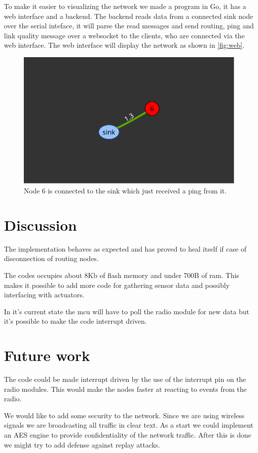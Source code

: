 \documentclass[a4paper,11pt]{article}
\begin{document}
To make it easier to visualizing the network we made a program in Go,
it has a web interface and a backend. The backend reads data from a
connected sink node over the serial inteface, it will parse the read
messages and send routing, ping and link quality message over a
websocket to the clients, who are connected via the web interface. The
web interface will display the network as shown in \autoref{fig:web}.

\begin{figure}[H]
  \begin{center}
    \includegraphics[width=.5\textwidth]{map}
  \end{center}
  \caption{Node 6 is connected to the sink which just received a ping from it.}
  \label{fig:web}
\end{figure}

\section{Discussion}
The implementation behaves as expected and has proved to heal itself
if case of disconnection of routing nodes. 

The codes occupies about 8Kb of flash memory and under 700B of
ram. This makes it possible to add more code for gathering sensor data
and possibly interfacing with actuators. 

In it's current state the mcu will have to poll the radio module for
new data but it's possible to make the code interrupt driven.

\section{Future work}
The code could be made interrupt driven by the use of the interrupt 
pin on the radio modules. This would make the nodes faster at reacting
to events from the radio. 

We would like to add some security to the network. Since we are using
wireless signals we are broadcasting all traffic in clear text. As a 
start we could implement an AES engine to provide confidentiality of  
the network traffic. After this is done we might try to add defense against 
replay attacks. 
\end{document}
